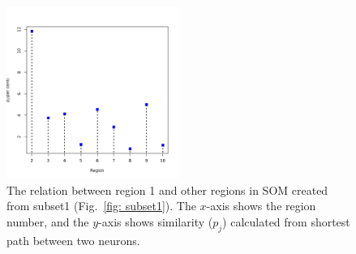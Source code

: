 \begin{figure}
        \centering
        \includegraphics[width=0.5\textwidth]{../../images0.01/M31/2D/image_subsets/similarity_plot.pdf}
    \caption{The relation between region 1 and other regions in SOM created from subset1 (Fig.~\ref{fig: subset1}). The $x$-axis shows the region number, and the $y$-axis shows similarity ($p_j$) calculated from shortest path between two neurons.}
    \label{fig: sim_subset1}
\end{figure}